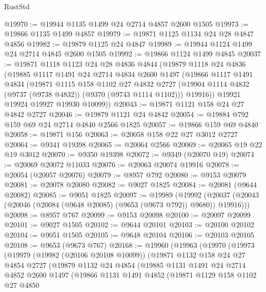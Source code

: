 \begin{lexlean}{RustStd}
\begin{coremodule}
@19970 := @19944 @1135 @1499 @24 @2714 @4857 @2600 @1505
@19973 := @19866 @1135 @1499 @4857
@19979 := @19871 @1125 @1134 @24 @28 @4847 @4856
@19982 := @19879 @1125 @24 @4847
@19989 := @19944 @1124 @1499 @24 @2714 @4845 @2600 @1505
@19992 := @19866 @1124 @1499 @4845
@20037 := @19871
    @1118
    @1123
    @24
    @28
    @4836
    @4844
    (@19879
      @1118
      @24
      @4836
      (@19885
        @1117
        @1491
        @24
        @2714
        @4834
        @2600
        @1497
        (@19866
          @1117
          @1491
          @4834
          (@19871
            @1115
            @158
            @1102
            @27
            @4832
            @2727
            (@19904 @1114 @4832 (@9737 (@9738 @4832)) (@9370 (@9743 @1114 @1102)))
            @19916))
        @19921
        @19924
        @19927
        @19930
        @10099))
@20043 := @19871 @1121 @158 @24 @27 @4842 @2727
@20046 := @19879 @1121 @24 @4842
@20054 := @19884 @792 @159 @69 @24 @2714 @4840 @2566 @1825
@20057 := @19866 @159 @69 @4840
@20058 := @19871 @156
@20063 := @20058 @158 @22 @27 @3012 @2727
@20064 := @9341 @19398
@20065 := @20064 @2566
@20069 := @20065 @19 @22 @19 @3012
@20070 := @9350 @19398
@20072 := @9349 (@20070 @19)
@20074 := @20069 @20072 @11033
@20076 := @20063 @20074 @19916
@20078 := @20054 (@20057 @20076)
@20079 := @8957 @792
@20080 := @9153 @20079
@20081 := @20078 @20080
@20082 := @9027 @1825
@20084 := @20081 (@9644 @20082)
@20085 := @9051 @1825
@20097 := @19989
    (@19992 (@20037 (@20043 (@20046 (@20084 (@9648 @20085) (@9653 (@9673 @792)) @9680)) @19916)))
@20098 := @8957 @767
@20099 := @9153 @20098
@20100 := @20097 @20099
@20101 := @9027 @1505
@20102 := @9644 @20101
@20103 := @20100 @20102
@20104 := @9051 @1505
@20105 := @9648 @20104
@20106 := @20103 @20105
@20108 := @9653 (@9673 @767)
@20168 := @19960
    (@19963
      (@19970
        (@19973
          (@19979
            (@19982 (@20106 @20108 @10099))
            (@19871
              @1132
              @158
              @24
              @27
              @4854
              @2727
              (@19879
                @1132
                @24
                @4854
                (@19885
                  @1131
                  @1491
                  @24
                  @2714
                  @4852
                  @2600
                  @1497
                  (@19866
                    @1131
                    @1491
                    @4852
                    (@19871
                      @1129
                      @158
                      @1102
                      @27
                      @4850

\end{coremodule}
\end{lexlean}
